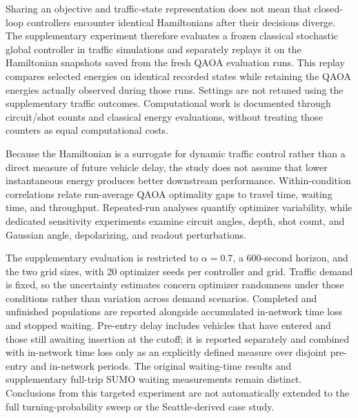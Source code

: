 Sharing an objective and traffic-state representation does not mean that closed-loop controllers encounter identical Hamiltonians after their decisions diverge. The supplementary experiment therefore evaluates a frozen classical stochastic global controller in traffic simulations and separately replays it on the Hamiltonian snapshots saved from the fresh QAOA evaluation runs. This replay compares selected energies on identical recorded states while retaining the QAOA energies actually observed during those runs. Settings are not retuned using the supplementary traffic outcomes. Computational work is documented through circuit/shot counts and classical energy evaluations, without treating those counters as equal computational costs.

Because the Hamiltonian is a surrogate for dynamic traffic control rather than a direct measure of future vehicle delay, the study does not assume that lower instantaneous energy produces better downstream performance. Within-condition correlations relate run-average QAOA optimality gaps to travel time, waiting time, and throughput. Repeated-run analyses quantify optimizer variability, while dedicated sensitivity experiments examine circuit angles, depth, shot count, and Gaussian angle, depolarizing, and readout perturbations.

The supplementary evaluation is restricted to $\alpha=0.7$, a 600-second horizon, and the two grid sizes, with 20 optimizer seeds per controller and grid. Traffic demand is fixed, so the uncertainty estimates concern optimizer randomness under those conditions rather than variation across demand scenarios. Completed and unfinished populations are reported alongside accumulated in-network time loss and stopped waiting. Pre-entry delay includes vehicles that have entered and those still awaiting insertion at the cutoff; it is reported separately and combined with in-network time loss only as an explicitly defined measure over disjoint pre-entry and in-network periods. The original waiting-time results and supplementary full-trip SUMO waiting measurements remain distinct. Conclusions from this targeted experiment are not automatically extended to the full turning-probability sweep or the Seattle-derived case study.

